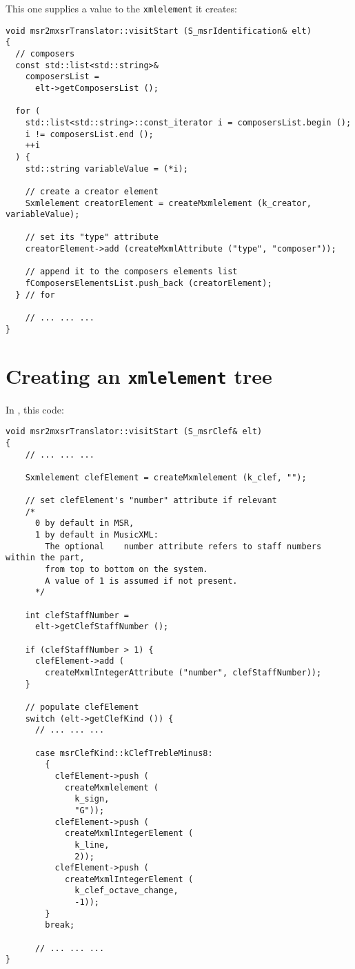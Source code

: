 This one supplies a value to the {\tt xmlelement} it creates:
\begin{lstlisting}[language=CPlusPlus]
void msr2mxsrTranslator::visitStart (S_msrIdentification& elt)
{
  // composers
  const std::list<std::string>&
    composersList =
      elt->getComposersList ();

  for (
    std::list<std::string>::const_iterator i = composersList.begin ();
    i != composersList.end ();
    ++i
  ) {
    std::string variableValue = (*i);

    // create a creator element
    Sxmlelement creatorElement = createMxmlelement (k_creator, variableValue);

    // set its "type" attribute
    creatorElement->add (createMxmlAttribute ("type", "composer"));

    // append it to the composers elements list
    fComposersElementsList.push_back (creatorElement);
  } // for

	// ... ... ...
}
\end{lstlisting}


\section{Creating an {\tt xmlelement} tree}

In {\tt }, this code:
\begin{lstlisting}[language=CPlusPlus]
void msr2mxsrTranslator::visitStart (S_msrClef& elt)
{
    // ... ... ...

    Sxmlelement clefElement = createMxmlelement (k_clef, "");

    // set clefElement's "number" attribute if relevant
    /*
      0 by default in MSR,
      1 by default in MusicXML:
        The optional	number attribute refers to staff numbers within the part,
        from top to bottom on the system.
        A value of 1 is assumed if not present.
	  */

    int clefStaffNumber =
      elt->getClefStaffNumber ();

    if (clefStaffNumber > 1) {
      clefElement->add (
        createMxmlIntegerAttribute ("number", clefStaffNumber));
    }

    // populate clefElement
    switch (elt->getClefKind ()) {
      // ... ... ...

      case msrClefKind::kClefTrebleMinus8:
        {
          clefElement->push (
            createMxmlelement (
              k_sign,
              "G"));
          clefElement->push (
            createMxmlIntegerElement (
              k_line,
              2));
          clefElement->push (
            createMxmlIntegerElement (
              k_clef_octave_change,
              -1));
        }
        break;

      // ... ... ...
}
\end{lstlisting}

